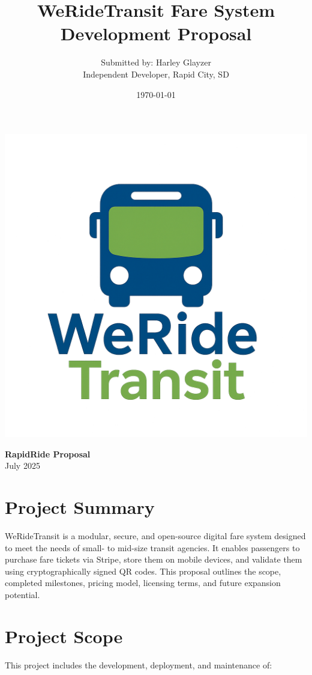 \documentclass[12pt]{article}
\title{WeRideTransit Fare System Development Proposal}
\author{Submitted by: Harley Glayzer\\
Independent Developer, Rapid City, SD}
\date{\today}
\begin{document}
\begin{minipage}{0.3\textwidth}
    \includegraphics[width=\textwidth]{WeRideTransit_vertical.png}
\end{minipage}
\hfill
\begin{minipage}{0.65\textwidth}
    \centering
    {\Huge\bfseries RapidRide Proposal}\\[0.5em]
    {\large July 2025}
\end{minipage}

\section{Project Summary}
WeRideTransit is a modular, secure, and open-source digital fare system designed to meet the needs of small- to mid-size transit agencies. It enables passengers to purchase fare tickets via Stripe, store them on mobile devices, and validate them using cryptographically signed QR codes. This proposal outlines the scope, completed milestones, pricing model, licensing terms, and future expansion potential.

\section{Project Scope}
This project includes the development, deployment, and maintenance of:
\end{document}
